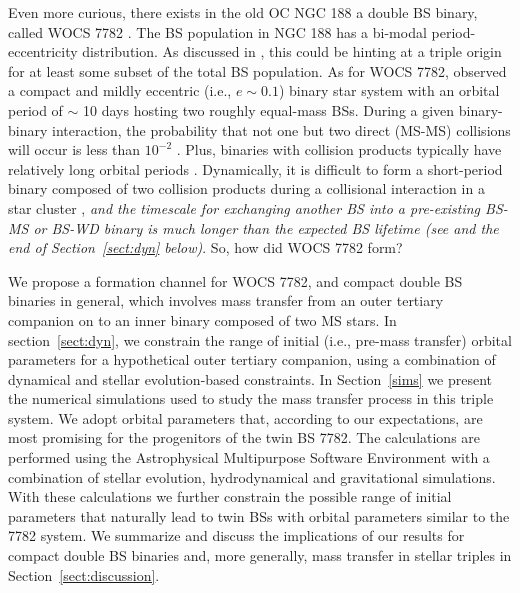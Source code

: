 \documentclass[twocolumn]{aastex62}
\begin{document}
Even more curious, there exists in the old OC NGC 188 a
double BS binary, called WOCS 7782 \citep{geller08}.  The BS
population in NGC 188 has a bi-modal period-eccentricity distribution.
As discussed in \citet{2011MNRAS.410.2370L}, this could be hinting at
a triple origin for at least some subset of the total BS population.
As for WOCS 7782, \citet{2009Natur.462.1032M} observed a compact and
mildly eccentric (i.e., $e \sim 0.1$) binary star system with an
orbital period of $\sim$ 10 days hosting two roughly equal-mass BSs.  During a given binary-binary interaction, the probability
that not one but two direct (MS-MS) collisions will occur is less than
$10^{-2}$
\citep{1989AJ.....98..217L,2011MNRAS.410.2370L,2012MNRAS.425.2369L}.
Plus, binaries with collision products typically have relatively long
orbital periods \cite{2011Sci...334.1380F}. Dynamically, it is
difficult to form a short-period binary composed of two collision
products during a collisional interaction in a star cluster
\citep{2011MNRAS.410.2370L,2011Sci...334.1380F}, \textit{and the timescale for exchanging another BS into a pre-existing BS-MS or BS-WD binary is much longer than the expected BS lifetime (see \citet{2011MNRAS.410.2370L} and the end of Section~\ref{sect:dyn} below)}.  So, how did WOCS 7782 form?

We propose a formation channel for WOCS 7782, and compact double BS
binaries in general, which involves mass transfer from an outer
tertiary companion on to an inner binary composed of two MS stars.  In
section~\ref{sect:dyn}, we constrain the range of initial (i.e.,
pre-mass transfer) orbital parameters for a hypothetical outer
tertiary companion, using a combination of dynamical and stellar
evolution-based constraints.  In Section~\ref{sims} we present the
numerical simulations used to study the mass transfer process in this
triple system. We adopt orbital parameters that, according to our
expectations, are most promising for the progenitors of the twin BS
7782.  The calculations are performed using the Astrophysical
Multipurpose Software Environment \cite[\texttt{AMUSE} for short,
  see][]{PortegiesZwart2013456,AMUSE} with a combination of stellar
evolution, hydrodynamical and gravitational simulations.  With these
calculations we further constrain the possible range of initial
parameters that naturally lead to twin BSs with orbital parameters
similar to the 7782 system.  We summarize and discuss the implications
of our results for compact double BS binaries and, more generally,
mass transfer in stellar triples in Section~\ref{sect:discussion}.
\end{document}
